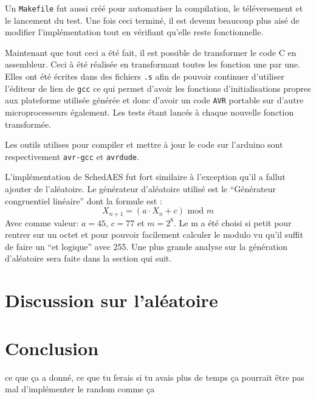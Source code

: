 \documentclass[letterpaper]{article}
\begin{document}
Un \texttt{Makefile} fut aussi créé pour automatiser la compilation, le téléversement et le lancement du test. Une fois ceci terminé, il est devenu beaucoup plus aisé de modifier l'implémentation tout en vérifiant qu'elle reste fonctionnelle. 

Maintenant que tout ceci a été fait, il est possible de transformer le code C en assembleur.
Ceci à été réalisée en transformant toutes les fonction une par une.
Elles ont été écrites dans des fichiers \texttt{.s} afin de pouvoir continuer d'utiliser l'éditeur de lien de \texttt{gcc} ce qui permet d'avoir les fonctions d'initialisations propres aux plateforme utilisée générée et donc d'avoir un code \texttt{AVR} portable sur d'autre microprocesseurs également.
Les tests étant lancés à chaque nouvelle fonction transformée.

Les outils utilises pour compiler et mettre à jour le code sur l'arduino sont respectivement \texttt{avr-gcc} et \texttt{avrdude}.

L'implémentation de SchedAES fut fort similaire à l'exception qu'il a fallut ajouter de l'aléatoire.
Le générateur d'aléatoire utilisé est le ``Générateur congruentiel linéaire'' dont la formule est :
$$ X_{n+1} = (a \cdot X_n  + c) \text{ mod } m$$
Avec comme valeur: $a=45$, $c=77$ et $m=2^8$. Le m a été choisi si petit pour rentrer sur un octet et pour pouvoir facilement calculer le modulo vu qu'il suffit de faire un ``et logique'' avec 255.
Une plus grande analyse sur la génération d'aléatoire sera faite dans la section qui suit.


\section{Discussion sur l'aléatoire}
\label{sec:rand}

\section{Conclusion}
ce que ça a donné, ce que tu ferais si tu avais plus de temps
ça pourrait être pas mal d'implémenter le random comme ça


\footnotesize


\end{document}
